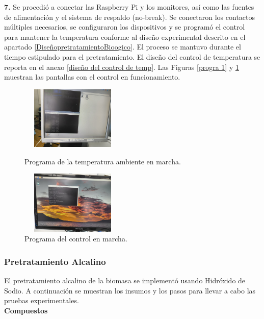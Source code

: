 \documentclass[12pt]{article}
\begin{document}
			
			\textbf{7. } Se procedió a conectar las Raspberry Pi y los monitores, así como las fuentes de alimentación y el sistema de respaldo (no-break). Se conectaron los contactos múltiples necesarios, se configuraron los dispositivos y se programó el control para mantener la temperatura conforme al diseño experimental descrito en el apartado \ref{DiseñopretratamientoBioogico}. El proceso se mantuvo durante el tiempo estipulado para el pretratamiento. El diseño del control de temperatura se reporta en el anexo \ref{diseño del control de temp}. Las Figuras \ref{progra 1} y \ref{progra 2} muestran las pantallas con el control en funcionamiento.
			
			\begin{figure}[H]
				\centering
				\begin{minipage}{0.46\textwidth}
					\centering
					\includegraphics[width=5cm, height=3cm]{imagenes/programa1} %
					\caption{Programa de la temperatura ambiente en marcha.}
					\label{progra 1}
				\end{minipage}
				\hfill
				\begin{minipage}{0.48\textwidth}
					\centering
					\includegraphics[width=5cm, height=3cm]{imagenes/programa2} %
					\caption{Programa del control en marcha.}
					\label{progra 2}
				\end{minipage}
			\end{figure}
			

			
			
			\subsubsection{Pretratamiento Alcalino}
			El pretratamiento alcalino de la biomasa se implementó usando Hidróxido de Sodio. A continuación se muestran los insumos y los pasos para llevar a cabo las pruebas experimentales.		
			\\[1 em]
			\textbf{Compuestos} 
			\\[0.5em]
			
\end{document}
